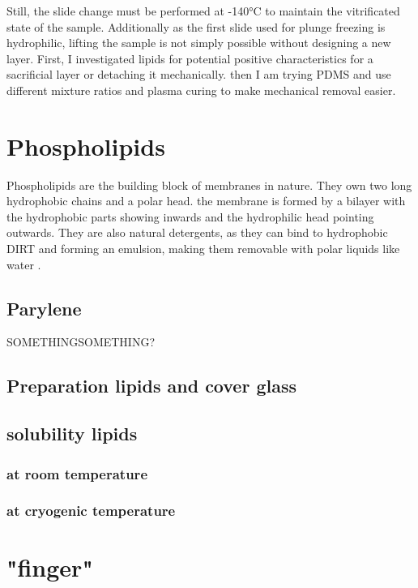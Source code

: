 Still, the slide change must be performed at -140°C to maintain the vitrificated state of the sample. Additionally as the first slide used for plunge freezing is hydrophilic, lifting the sample is not simply possible without designing a new layer. First, I investigated lipids for potential positive characteristics for a sacrificial layer or detaching it mechanically. then I am trying PDMS and use different mixture ratios and plasma curing to make mechanical removal easier.

\section{Phospholipids}

Phospholipids are the building block of membranes in nature. They own two long hydrophobic chains and a polar head. the membrane is formed by a bilayer with the hydrophobic parts showing inwards and the hydrophilic head pointing outwards. They are also natural detergents, as they can bind to hydrophobic DIRT and forming an emulsion, making them removable with polar liquids like water \cite{SriramaM.BhairiPh.D..}.

\subsection{Parylene}

 SOMETHINGSOMETHING?

\subsection{Preparation lipids and cover glass}

\subsection{solubility lipids}

\subsubsection{at room temperature}

\subsubsection{at cryogenic temperature}

\section{"finger"}

